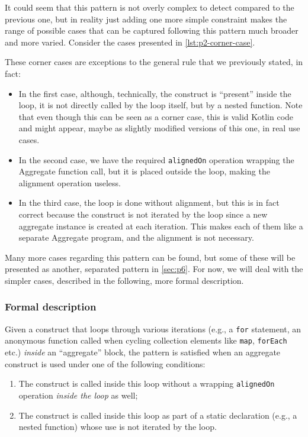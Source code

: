 \documentclass[12pt,a4paper,openright,twoside]{book}
\begin{document}
It could seem that this pattern is not overly complex to detect compared to the
previous one, but in reality just adding one more simple constraint makes the
range of possible cases that can be captured following this pattern much broader
and more varied. Consider the cases presented in \cref{lst:p2-corner-case}. 

These corner cases are exceptions to the general rule that we previously stated,
in fact:
\begin{itemize}
  \item In the first case, although, technically, the construct is ``present''
  inside the loop, it is not directly called by the loop itself, but by a nested
  function. Note that even though this can be seen as a corner case, this is
  valid Kotlin code and might appear, maybe as slightly modified versions of
  this one, in real use cases.
  \item In the second case, we have the required \lstinline{alignedOn} operation
  wrapping the Aggregate function call, but it is placed outside the loop,
  making the alignment operation useless.
  \item In the third case, the loop is done without alignment, but this is in
  fact correct because the construct is not iterated by the loop since a new
  aggregate instance is created at each iteration. This makes each of them
  like a separate Aggregate program, and the alignment is not necessary.
\end{itemize}

Many more cases regarding this pattern can be found, but some of these will be
presented as another, separated pattern in \cref{sec:p6}. For now, we will deal
with the simpler cases, described in the following, more formal description.

\subsubsection{Formal description}

Given a construct that loops through various iterations (e.g., a \lstinline{for}
statement, an anonymous function called when cycling collection elements like
\lstinline{map}, \lstinline{forEach} etc.) \emph{inside} an ``aggregate'' block,
the pattern is satisfied when an aggregate construct is used under one of the
following conditions:
\begin{enumerate}
  \item The construct is called inside this loop without a wrapping
  \lstinline{alignedOn} operation \emph{inside the loop} as well;
  \item The construct is called inside this loop as part of a static declaration
  (e.g., a nested function) whose use is not iterated by the loop.
\end{enumerate}
\end{document}
